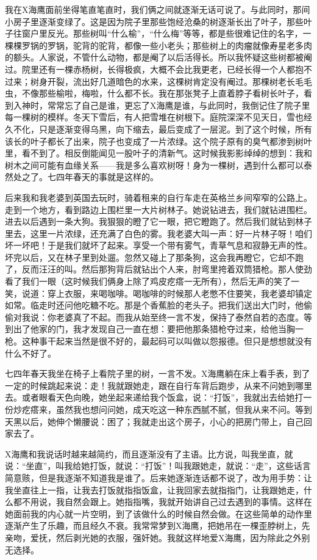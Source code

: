 我在X海鹰面前坐得笔直笔直时，我们俩之间就逐渐无话可说了。与此同时，那间小房子里逐渐变绿了。这是因为院子里那些饱经沧桑的树逐渐长出了叶子，那些叶子往窗户里反光。那些树叫“什么榆”，“什么梅”等等，都是些很难记住的名字，一棵棵罗锅的罗锅，驼背的驼背，都像一些小老头；那些树上的肉瘤就像寿星老多肉的额头。人家说，不管什么动物，都是阉了以后活得长。所以我怀疑这些树都被阉过。院里还有一棵赤杨树，长得极疯，大概不会比我更老，已经长得一个人都抱不过来；树身开裂，流出好几道暗色的水来，这棵树肯定没有阉过。那棵树老长毛毛虫，不像那些榆啦，梅啦，什么都不长。我在那张凳子上直着脖子看树长叶子，看到入神时，常常忘了自己是谁，更忘了X海鹰是谁，与此同时，我倒记住了院子里每一棵树的模样。冬天下雪后，有人把雪堆在树根下。庭院深深不见天日，雪也经久不化，只是逐渐变得乌黑，向下缩去，最后变成了一层泥。到了这个时候，所有该长的叶子都长了出来，院子也变成了一片浓绿。这个院子原有的臭气都渗到树叶里，看不到了。相反倒能闻见一股叶子的清新气。这时候我影影绰绰的想到：我和树木之间可能有血缘关系——我是多么喜欢树呀！身为一棵树，遇到什么都可以泰然处之了。七四年春天的事就是这样的。 

后来我和我老婆到英国去玩时，骑着租来的自行车走在英格兰乡间窄窄的公路上。走到一个地方，看到路边上围栏里一大片树林子。她说钻进去，我们就钻进围栏。进去以后遇到一条大狗。我狠狠的瞪了它一眼，把它瞪跑了。然后我们就钻到林子里去，这里一片浓绿，还充满了白色的雾。我老婆大叫一声：好一片林子呀！咱们坏一坏吧！于是我们就坏了起来。享受一个带有雾气，青草气息和寂静无声的性。坏完以后，又在林子里到处遛。忽然又碰上了那条狗，这会我再瞪它，它却不跑了，反而汪汪的叫。然后那狗背后就钻出个人来，肘弯里挎着双筒猎枪。那人使劲看了我们一眼（这时候我们俩身上除了鸡皮疙瘩一无所有），然后无声的笑了一笑，说道：穿上衣服，来喝咖啡。喝咖啡的时候那人老憋不住要笑，我老婆却镇定如常。临走时还问他吃糖不吃。那是个香蕉脸的老头子。把我们送出大门时，他偷偷对我说：你老婆真了不起。而我从始至终一言不发，保持了泰然自若的态度。等到出了他家的门，我才发现自己一直在想：要把他那条猎枪夺过来，给他当胸一枪。这种事干起来当然是很不好的，最起码可以叫做以怨报德。但只是想想就没有什么不好了。 

七四年春天我坐在椅子上看院子里的树，一言不发。X海鹰躺在床上看手表，到了一定的时候跳起来说：走！我就跟她走，跟在自行车背后跑步，从来不问她到哪里去。或者眼看天色向晚，她坐起来递给我个饭盒，说：“打饭”，我就出去给她打一份炒疙瘩来，虽然我也想问问她，成天吃这一种东西腻不腻，但我从来不问。等到天黑以后，她伸个懒腰说：困了；我就走出这个房子，小心的把房门带上，自己回家去了。 

X海鹰和我说话时越来越简约，而且逐渐没有了主语。比方说，叫我坐直，就说：“坐直”，叫我给她打饭，就说：“打饭”！叫我跟她走，就说：“走”，这些话言简意赅，但是我逐渐不知道我是谁了。后来她逐渐连话都不说了，改为用手势：让我坐直往上一指，让我去打饭就指指饭盒，让我回家去就指指门，让我跟她走，什么都不用说，我自然会跟上。她指指嘴，我就开始讲自己过去遇到的事情。这样在她面前我的内心就一片空明，到了该做什么的时候自然会做。在这些简单的动作里逐渐产生了乐趣，而且经久不衰。我常常梦到X海鹰，把她吊在一棵歪脖树上，先亲吻，爱抚，然后剥光她的衣服，强奸她。我就这样地爱X海鹰，因为除此之外别无选择。

